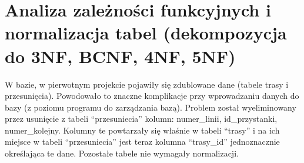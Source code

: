 \section{Analiza zależności funkcyjnych i normalizacja tabel (dekompozycja do 3NF, BCNF, 4NF, 5NF)}
W bazie, w pierwotnym projekcie pojawiły się zdublowane dane (tabele trasy i przesunięcia). Powodowało to znaczne komplikacje przy wprowadzaniu danych do bazy 
(z poziomu programu do zarządzania bazą). Problem został wyeliminowany przez usunięcie z tabeli ``przesuniecia'' kolumn: numer_linii, id_przystanki, numer_kolejny. Kolumny te powtarzały się właśnie w tabeli ``trasy'' i na ich miejsce w tabeli ``przesuniecia'' jest teraz kolumna ``trasy_id'' jednoznacznie określająca te dane. Pozostałe tabele nie wymagały normalizacji.
